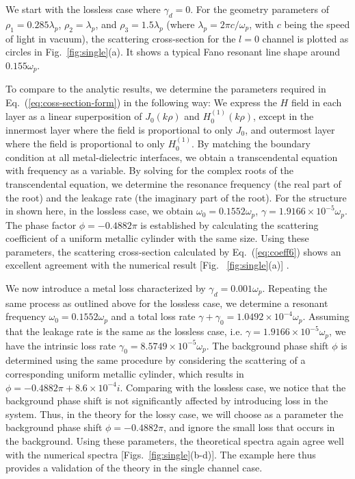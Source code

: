 \documentclass[preprint,aps]{revtex4}
\begin{document}
We start with the lossless case where $\gamma_d=0$. For the geometry
parameters of $\rho_1=0.285\lambda_p$, $\rho_2=\lambda_p$, and
$\rho_3=1.5\lambda_p$ (where $\lambda_p= 2 \pi c/ \omega_p$, with
$c$ being the speed of light in vacuum), the scattering
cross-section for the $l=0$ channel is plotted as circles in
Fig.~\ref{fig:single}(a). It shows a typical Fano resonant line
shape around $0.155\omega_p$.

To compare to the analytic results, we determine the parameters
required in Eq.~(\ref{eq:coss-section-form}) in the following way:
We express the $H$ field in each layer as a linear superposition of
$J_0(k\rho)$ and $H^{(1)}_0(k\rho)$, except in the innermost layer
where the field is proportional to only $J_0$, and outermost layer
where the field is proportional to only $H^{(1)}_0$. By matching the
boundary condition at all metal-dielectric interfaces, we obtain a
transcendental equation with frequency as a variable. By solving for
the complex roots of the transcendental equation, we determine the
resonance frequency (the real part of the root) and the leakage rate
(the imaginary part of the root). For the structure in shown here,
in the lossless case, we obtain $\omega_0 = 0.1552\omega_p$, $\gamma
= 1.9166\times10^{-5}\omega_p$. The phase factor $\phi= -0.4882\pi$
is established by calculating the scattering coefficient of a
uniform metallic cylinder with the same size. Using these
parameters, the scattering cross-section calculated by
Eq.~(\ref{eq:coeff6}) shows an excellent agreement with the
numerical result [Fig. ~\ref{fig:single}(a)] .


We now introduce a metal loss characterized by
$\gamma_d=0.001\omega_p$. Repeating the same process as outlined
above for the lossless case, we determine a resonant frequency
$\omega_0 = 0.1552\omega_p$ and a total loss rate $\gamma + \gamma_0
= 1.0492\times10^{-4}\omega_p$. Assuming that the leakage rate is
the same as the lossless case, i.e.
$\gamma=1.9166\times10^{-5}\omega_p$, we have the intrinsic loss
rate $\gamma_0=8.5749\times10^{-5}\omega_p$. The background phase
shift $\phi$ is determined using the same procedure by considering
the scattering of a corresponding uniform metallic cylinder, which
results in $\phi=-0.4882\pi+8.6\times10^{-4}i$. Comparing with the
lossless case, we notice that the background phase shift is not
significantly affected by introducing loss in the system.  Thus, in
the theory for the lossy case, we will choose as a parameter the
background phase shift $\phi = - 0.4882 \pi$, and ignore the small
loss that occurs in the background. Using these parameters, the
theoretical spectra again agree well with the numerical spectra
[Figs.~\ref{fig:single}(b-d)].  The example here thus provides a
validation of the theory in the single channel case.
\end{document}
